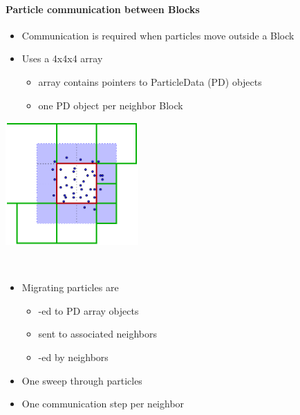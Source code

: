 %
%
%
%

\begin{frame}[fragile,label=ss-recent-particles] 
  \secframetitle{\ssRecentParticles}
  \framesubtitle{Particle communication between Blocks}
\begin{itemize}
\item Communication is required when particles move outside a Block 
\item Uses a 4x4x4 array
\begin{itemize}
\item array contains pointers to ParticleData (PD) objects
\item one PD object per neighbor Block
\end{itemize}

\end{itemize}
\begin{minipage}{1.8in}
\includegraphics[width=2.0in]{particle-refresh-2.pdf}
\end{minipage} \ 
\begin{minipage}{2.7in}
\begin{itemize}
\item Migrating particles are
\begin{itemize}
\item {}-ed to PD array objects
\item sent to associated neighbors
\item {}-ed by neighbors
\end{itemize}
\item One sweep through particles
\item One communication step per neighbor
\end{itemize}
\end{minipage}
\end{frame}

